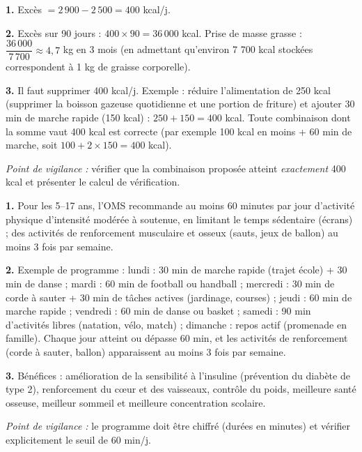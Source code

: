 \documentclass[11pt]{article}
\begin{document}
\begin{corrige}
\textbf{1.} Excès $= 2\,900 - 2\,500 = 400$ kcal/j.

\textbf{2.} Excès sur 90 jours : $400 \times 90 = 36\,000$ kcal. Prise de masse grasse : $\dfrac{36\,000}{7\,700} \approx 4,7$ kg en 3 mois (en admettant qu'environ 7 700 kcal stockées correspondent à 1 kg de graisse corporelle).

\textbf{3.} Il faut supprimer 400 kcal/j. Exemple : réduire l'alimentation de 250 kcal (supprimer la boisson gazeuse quotidienne et une portion de friture) et ajouter 30 min de marche rapide (150 kcal) : $250 + 150 = 400$ kcal. Toute combinaison dont la somme vaut 400 kcal est correcte (par exemple 100 kcal en moins + 60 min de marche, soit $100 + 2 \times 150 = 400$ kcal).

\emph{Point de vigilance :} vérifier que la combinaison proposée atteint \emph{exactement} 400 kcal et présenter le calcul de vérification.
\end{corrige}

\begin{corrige}
\textbf{1.} Pour les 5--17 ans, l'OMS recommande au moins 60 minutes par jour d'activité physique d'intensité modérée à soutenue, en limitant le temps sédentaire (écrans) ; des activités de renforcement musculaire et osseux (sauts, jeux de ballon) au moins 3 fois par semaine.

\textbf{2.} Exemple de programme : lundi : 30 min de marche rapide (trajet école) + 30 min de danse ; mardi : 60 min de football ou handball ; mercredi : 30 min de corde à sauter + 30 min de tâches actives (jardinage, courses) ; jeudi : 60 min de marche rapide ; vendredi : 60 min de danse ou basket ; samedi : 90 min d'activités libres (natation, vélo, match) ; dimanche : repos actif (promenade en famille). Chaque jour atteint ou dépasse 60 min, et les activités de renforcement (corde à sauter, ballon) apparaissent au moins 3 fois par semaine.

\textbf{3.} Bénéfices : amélioration de la sensibilité à l'insuline (prévention du diabète de type 2), renforcement du cœur et des vaisseaux, contrôle du poids, meilleure santé osseuse, meilleur sommeil et meilleure concentration scolaire.

\emph{Point de vigilance :} le programme doit être chiffré (durées en minutes) et vérifier explicitement le seuil de 60 min/j.
\end{corrige}
\end{document}
